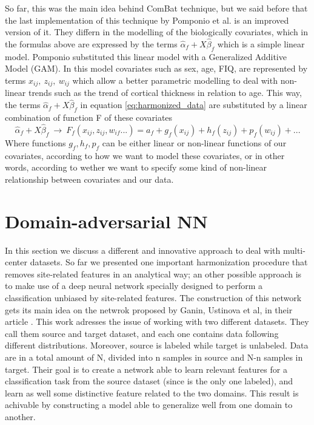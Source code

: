 \documentclass[10pt]{report}
\begin{document}
So far, this was the main idea behind ComBat technique, but we said before that the last implementation of this technique by Pomponio et al. \cite{pomponio-2019} is an improved version of it.
They differn in the modelling of the biologically covariates, which in the formulas above are expressed by the terms $\hat \alpha_f + X \hat \beta_f$ which is a simple linear model.
Pomponio substituted this linear model with a Generalized Additive Model (GAM). In this model covariates such as sex, age, FIQ, are represented by terms $x_{ij}, \ z_{ij}, \ w_{ij}$ which allow a better parametric modelling to deal with non-linear trends such as the trend of cortical thickness in relation to age.
This way, the terms $\hat \alpha_f + X \hat \beta_f$ in equation \ref{eq:harmonized_data} are substituted by a linear combination of function F of these covariates
\begin{equation}
\hat \alpha_f + X \hat \beta_f \ \longrightarrow \ F_f(x_{ij}, z_{ij}, w_{if}...) = a_f + g_f(x_{ij}) + h_f(z_{ij}) + p_f(w_{ij}) + ...
\end{equation}
Where functions $g_f, h_f, p_f$ can be either linear or non-linear functions of our covariates, according to how we want to model these covariates, or in other words, according to wether we want to specify some kind of non-linear relationship between covariates and our data.





\chapter{Domain-adversarial NN}\label{sec:domain_adversarial_theory}
In this section we discuss a different and innovative approach to deal with multi-center datasets.
So far we presented one important harmonization procedure that removes site-related features in an analytical way; an other possible approach is to make use of a deep neural network specially designed to perform a classification unbiased by site-related features.
The construction of this network gets its main idea on the netwrok proposed by Ganin, Ustinova et al, in their article \cite{ganin2016}.
This work adresses the issue of working with two different datasets. They call them source and target dataset, and each one contains data following different distributions. Moreover, source is labeled while target is unlabeled. Data are in a total amount of N, divided into n samples in source and N-n samples in target. Their goal is to create a network able to learn relevant features  for a classification task from the source dataset (since is the only one labeled), and learn as well some distinctive feature related to the two domains. This result is achivable by constructing a model able to generalize well from one domain to another.
\end{document}
